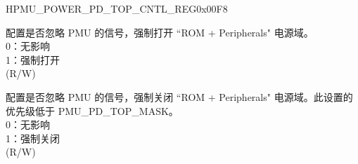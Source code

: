 \addtocounter{Regfloat}{-1}
\begin{register}{H}{PMU\_POWER\_PD\_TOP\_CNTL\_REG}{0x00F8}
\begin{regdesc}\begin{reglist}
\item [接上页...]


\label{fielddesc:PMUPDTOPMASK}\item [PMU\_PD\_TOP\_MASK] 配置是否忽略 PMU 的信号，强制打开 ``ROM + Peripherals" 电源域。\\
0：无影响 \\
1：强制打开 \\
(R/W)
\label{fielddesc:PMUPDTOPPDMASK}\item [PMU\_PD\_TOP\_PD\_MASK] 配置是否忽略 PMU 的信号，强制关闭 ``ROM + Peripherals" 电源域。此设置的优先级低于 PMU\_PD\_TOP\_MASK。
\\
0：无影响 \\
1：强制关闭 \\
(R/W)
\end{reglist}\end{regdesc}
\end{register}



